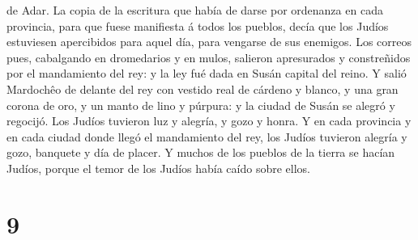 de Adar.  La copia de la escritura que había de darse por
ordenanza en cada provincia, para que fuese manifiesta á todos los
pueblos, decía que los Judíos estuviesen apercibidos para aquel día,
para vengarse de sus enemigos.  Los correos pues,
cabalgando en dromedarios y en mulos, salieron apresurados y
constreñidos por el mandamiento del rey: y la ley fué dada en Susán
capital del reino.  Y salió Mardochêo de delante del rey
con vestido real de cárdeno y blanco, y una gran corona de oro, y un
manto de lino y púrpura: y la ciudad de Susán se alegró y regocijó.
 Los Judíos tuvieron luz y alegría, y gozo y honra.
 Y en cada provincia y en cada ciudad donde llegó el
mandamiento del rey, los Judíos tuvieron alegría y gozo, banquete y día
de placer. Y muchos de los pueblos de la tierra se hacían Judíos, porque
el temor de los Judíos había caído sobre ellos.

\hypertarget{section-8}{%
\section{9}\label{section-8}}

